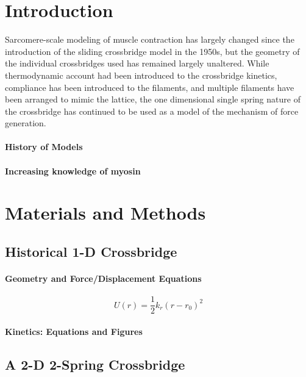 \documentclass[
	11pt]{article}
\begin{document}
\begin{multicols}{2}



\section*{Introduction}

Sarcomere-scale modeling of muscle contraction has largely changed since the introduction of the sliding crossbridge model in the 1950s, but the geometry of the individual crossbridges used has remained largely unaltered. While thermodynamic account had been introduced to the crossbridge kinetics, compliance has been introduced to the filaments, and multiple filaments have been arranged to mimic the lattice, the one dimensional single spring nature of the crossbridge has continued to be used as a model of the mechanism of force generation.

\paragraph*{History of Models}

\paragraph*{Increasing knowledge of myosin}



\section*{Materials and Methods}

\subsection*{Historical 1-D Crossbridge}
\paragraph*{Geometry and Force/Displacement Equations}

\begin{equation}
U(r)=\frac{1}{2}k_r (r-r_0)^2
\end{equation}

\paragraph*{Kinetics: Equations and Figures}

\subsection*{A 2-D 2-Spring Crossbridge}


\end{multicols}
\end{document}
